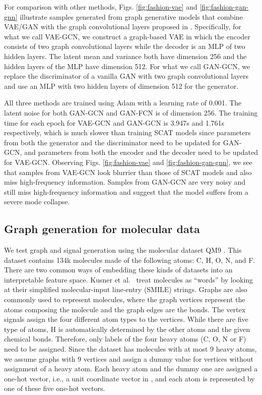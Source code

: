 \documentclass[conference]{IEEEtran}
\begin{document}
For comparison with other methods, Figs. \ref{fig:fashion-vae} and \ref{fig:fashion-gan-gnn} illustrate samples generated from graph generative models that combine VAE/GAN with the graph convolutional layers proposed in \cite{kipf2016semi}. Specifically, for what we call VAE-GCN, we construct a graph-based VAE in which the encoder consists of two graph convolutional layers while the decoder is an MLP of two hidden layers. The latent mean and variance both have dimension 256 and the hidden layers of the MLP have dimension 512. For what we call GAN-GCN, we replace the discriminator of a vanilla GAN with two graph convolutional layers and use an MLP with two hidden layers of dimension 512 for the generator. 
  
All three methods are trained using Adam with a learning rate of 0.001. The latent noise for both GAN-GCN and GAN-FCN is of dimension 256. The training time for each epoch for VAE-GCN and GAN-GCN is 3.947s and 1.761s respectively, which is much slower than training SCAT models since parameters from both the generator and the discriminator need to be updated for GAN-GCN, and parameters from both the encoder and the decoder need to be updated for VAE-GCN. Observing Figs. \ref{fig:fashion-vae} and \ref{fig:fashion-gan-gnn}, we see that samples from VAE-GCN look blurrier than those of SCAT models and also miss high-frequency information. Samples from GAN-GCN are very noisy and still miss high-frequency information and suggest that the model suffers from a severe mode collapse. 

 









\subsection{Graph generation for molecular data}\label{subsec:graphgen}
We test graph and signal generation using the molecular dataset QM9 \cite{ramakrishnan2014quantum}. This dataset contains 134k molecules made of the following atoms: C, H, O, N, and F. There are two common ways of embedding these kinds of datasets into an interpretable feature space. Kusner et al.~\cite{kusner2017grammar} treat molecules as ``words'' by looking at their simplified molecular-input line-entry (SMILE) strings.
Graphs are also commonly used to represent molecules, where the graph vertices represent the atoms composing the molecule and the graph edges are the bonds. The vertex signals assign the four different atom types to the vertices. While there are five type of atoms, H is automatically determined by the other atoms and the given chemical bonds. Therefore, only labels of the four heavy atoms (C, O, N or F) need to be assigned. Since the dataset has molecules with at most 9 heavy atoms, we assume graphs with 9 vertices and assign a dummy value for vertices without assignment of a heavy atom.
Each heavy atom and the dummy one are assigned a one-hot vector, i.e., a unit coordinate vector in , and each atom is represented by one of these five one-hot vectors.
\end{document}
